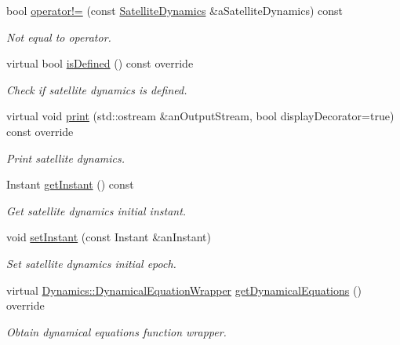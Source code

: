 \begin{DoxyCompactItemize}
bool \hyperlink{classostk_1_1astro_1_1flight_1_1system_1_1dynamics_1_1_satellite_dynamics_a0f65a238480359b9baf68ea4b2155eda}{operator!=} (const \hyperlink{classostk_1_1astro_1_1flight_1_1system_1_1dynamics_1_1_satellite_dynamics}{Satellite\+Dynamics} \&a\+Satellite\+Dynamics) const
\begin{DoxyCompactList}\small\item\em Not equal to operator. \end{DoxyCompactList}\item 
virtual bool \hyperlink{classostk_1_1astro_1_1flight_1_1system_1_1dynamics_1_1_satellite_dynamics_aa58384471ec8825964af48a4a2235fab}{is\+Defined} () const override
\begin{DoxyCompactList}\small\item\em Check if satellite dynamics is defined. \end{DoxyCompactList}\item 
virtual void \hyperlink{classostk_1_1astro_1_1flight_1_1system_1_1dynamics_1_1_satellite_dynamics_af60a82bf97622e5b3a670c38ab4ddd32}{print} (std\+::ostream \&an\+Output\+Stream, bool display\+Decorator=true) const override
\begin{DoxyCompactList}\small\item\em Print satellite dynamics. \end{DoxyCompactList}\item 
Instant \hyperlink{classostk_1_1astro_1_1flight_1_1system_1_1dynamics_1_1_satellite_dynamics_ac8533e79bcab9b158940e49bd2723f95}{get\+Instant} () const
\begin{DoxyCompactList}\small\item\em Get satellite dynamics initial instant. \end{DoxyCompactList}\item 
void \hyperlink{classostk_1_1astro_1_1flight_1_1system_1_1dynamics_1_1_satellite_dynamics_ad1fe1ebe85ac3d5024032e42b4083c95}{set\+Instant} (const Instant \&an\+Instant)
\begin{DoxyCompactList}\small\item\em Set satellite dynamics initial epoch. \end{DoxyCompactList}\item 
virtual \hyperlink{classostk_1_1astro_1_1flight_1_1system_1_1_dynamics_a9b14f4fbea6fe1e96af9e71545d4c77e}{Dynamics\+::\+Dynamical\+Equation\+Wrapper} \hyperlink{classostk_1_1astro_1_1flight_1_1system_1_1dynamics_1_1_satellite_dynamics_aed9ddda1a1d1c4636e2c0d6ccc9d5a16}{get\+Dynamical\+Equations} () override
\begin{DoxyCompactList}\small\item\em Obtain dynamical equations function wrapper. \end{DoxyCompactList}\end{DoxyCompactItemize}
